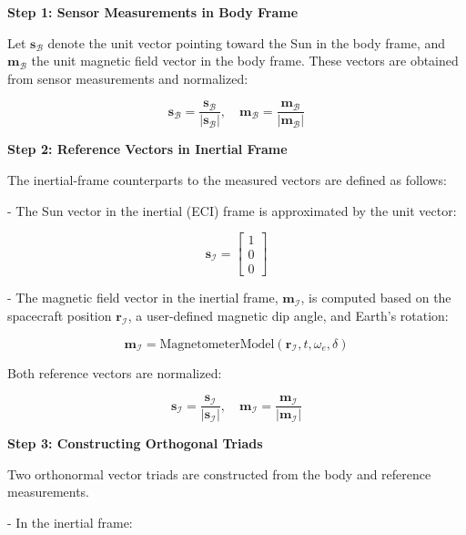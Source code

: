 \textbf{Step 1: Sensor Measurements in Body Frame}

Let $\mathbf{s}_{\mathcal{B}}$ denote the unit vector pointing toward the Sun in the body frame, and $\mathbf{m}_{\mathcal{B}}$ the unit magnetic field vector in the body frame. These vectors are obtained from sensor measurements and normalized:

\begin{equation}
    \mathbf{s}_{\mathcal{B}} = \frac{\mathbf{s}_{\mathcal{B}}}{|\mathbf{s}_{\mathcal{B}}|}, \quad
    \mathbf{m}_{\mathcal{B}} = \frac{\mathbf{m}_{\mathcal{B}}}{|\mathbf{m}_{\mathcal{B}}|}
\end{equation}

\textbf{Step 2: Reference Vectors in Inertial Frame}

The inertial-frame counterparts to the measured vectors are defined as follows:

- The Sun vector in the inertial (ECI) frame is approximated by the unit vector:

\begin{equation}
   \mathbf{s}_{\mathcal{I}} = \begin{bmatrix} 1 \\ 0 \\ 0 \end{bmatrix}
\end{equation}

- The magnetic field vector in the inertial frame, $\mathbf{m}_{\mathcal{I}}$, is computed based on the spacecraft position $\mathbf{r}_{\mathcal{I}}$, a user-defined magnetic dip angle, and Earth’s rotation:

\begin{equation}
   \mathbf{m}_{\mathcal{I}} = \text{MagnetometerModel}(\mathbf{r}_{\mathcal{I}}, t, \omega_e, \delta)
\end{equation}

Both reference vectors are normalized:

\begin{equation}
   \mathbf{s}_{\mathcal{I}} = \frac{\mathbf{s}_{\mathcal{I}}}{|\mathbf{s}_{\mathcal{I}}|}, \quad
   \mathbf{m}_{\mathcal{I}} = \frac{\mathbf{m}_{\mathcal{I}}}{|\mathbf{m}_{\mathcal{I}}|}
\end{equation}

\textbf{Step 3: Constructing Orthogonal Triads}

Two orthonormal vector triads are constructed from the body and reference measurements.

- In the inertial frame:

